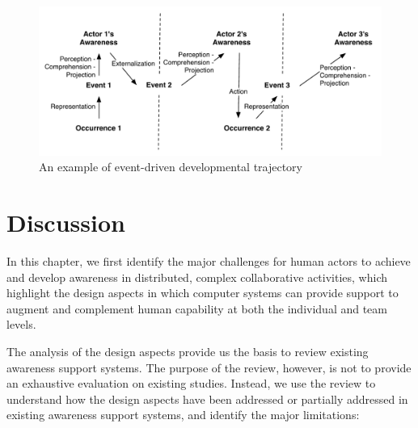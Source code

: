 \begin{figure}[htbp] %
   \centering
   \includegraphics[width=4.5in]{example_awareness_traj.pdf} 
   \caption{An example of event-driven developmental trajectory}
   \label{fig:example_awareness_traj}
\end{figure}

\section{Discussion} %
\label{sec:discussion}
In this chapter, we first identify the major challenges for human actors to achieve and develop awareness in distributed, complex collaborative activities, which highlight the design aspects in which computer systems can provide support to augment and complement human capability at both the individual and team levels. 

The analysis of the design aspects provide us the basis to review existing awareness support systems. The purpose of the review, however, is not to provide an exhaustive evaluation on existing studies. Instead, we use the review to understand how the design aspects have been addressed or partially addressed in existing awareness support systems, and identify the major limitations:

